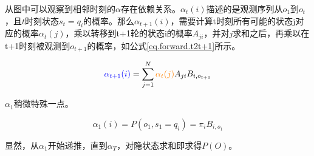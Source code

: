 \documentclass[]{article}
\begin{document}
    从图中可以观察到相邻时刻的$\alpha$存在依赖关系。$\alpha_{t}(i)$描述的是观测序列从$o_{1}$到$o_{t}$，且$t$时刻状态$s_{t}=q_{i}$的概率。那么$\alpha_{t+1}(i)$，需要计算t时刻所有可能的状态j对应的概率$\alpha_{t}(j)$，乘以转移到t+1轮的状态i的概率$A_{ji}$，并对$j$求和之后，再乘以在t+1时刻被观测到$o_{t+1}$的概率，如公式\ref{eq.forward.t2t+1}所示。
    
    \begin{equation}
    	\textcolor{blue}{\alpha_{t+1}(i)}=\sum_{j=1}^{N}\textcolor{orange}{\alpha_{t}(j)}A_{ji}B_{i,o_{t+1}} \label{eq.forward.t2t+1}
    \end{equation}

   $\alpha_{1}$稍微特殊一点。
   
   \begin{equation}
   	\alpha_{1}(i)=P(o_{1}, s_{1}=q_{i})=\pi_{i} B_{i,o_{1}}\label{eq.alpha.1}
   \end{equation}

  显然，从$\alpha_{1}$开始递推，直到$\alpha_{T}$，对隐状态求和即求得$P(O)$。

%



\begin{center}
\end{center}
\end{document}
